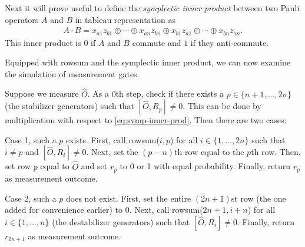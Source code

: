 Next it will prove useful to define the \emph{symplectic inner product} between
two Pauli operators $A$ and $B$ in tableau representation as
\begin{align}\label{eq:symp-inner-prod}
  A\cdot B = x_{a1}z_{b1} \oplus \cdots \oplus x_{an}z_{bn} \oplus x_{b1}
  z_{a1} \oplus \cdots \oplus x_{bn}z_{an}
.\end{align}
This inner product is $0$ if $A$ and $B$ commute and $1$ if they anti-commute.

Equipped with rowsum and the symplectic inner product, we can now examine the
simulation of measurement gates.
\begin{alg}\label{alg:tab-measure}
  Suppose we measure $\hat{O}$. As a $0$th step,
  check if there exists a $p\in\{n+1,\ldots,2n\}$ (the stabilizer
  generators) such that $[\hat{O},R_p] \neq 0$. This can be done by
  multiplication with respect to \cref{eq:symp-inner-prod}. Then there are two
  cases:

  Case 1, such a $p$ exists. First, call rowsum($i,p$) for all $i \in
  \{1,\ldots,2n\}$ such that $i\neq p$ and $[\hat{O},R_i] \neq 0$. Next,
  set the $(p-n)$th row equal to the $p$th row. Then, set row $p$ equal to
  $\hat{O}$ and set $r_p$ to 0 or 1 with equal probability. Finally, return
  $r_p$ as measurement outcome.

  Case 2, such a $p$ does not exist. First, set the entire $(2n+1)$st row (the one
  added for convenience earlier) to 0. Next, call rowsum($2n+1, i+n$) for all
  $i\in\{1,\ldots,n\}$ (the destabilizer generators) such that
  $[\hat{O},R_i]\neq 0$. Finally, return $r_{2n+1}$ as measurement outcome. 
\end{alg}

